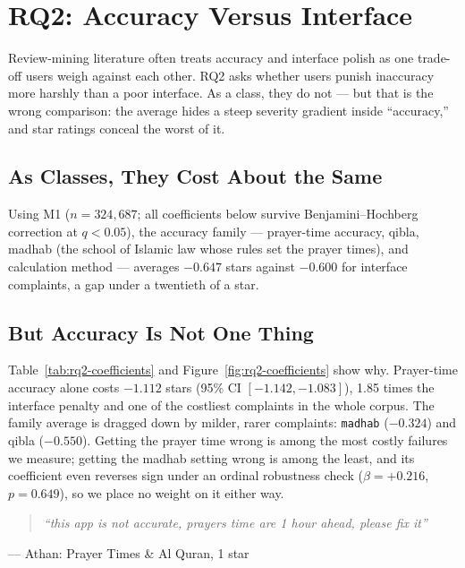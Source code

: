 
\section{RQ2: Accuracy Versus Interface}
\label{sec:rq2}

Review-mining literature often treats accuracy and interface polish as one
trade-off users weigh against each other. RQ2 asks whether users punish
inaccuracy more harshly than a poor interface. As a class, they do not ---
but that is the wrong comparison: the average hides a steep severity gradient
inside ``accuracy,'' and star ratings conceal the worst of it.

\subsection{As Classes, They Cost About the Same}

Using M1 (\(n=324{,}687\); all coefficients below survive Benjamini--Hochberg
correction at \(q<0.05\)), the accuracy family --- prayer-time accuracy,
qibla, madhab (the school of Islamic law whose rules set the prayer times),
and calculation method --- averages \(-0.647\) stars against \(-0.600\) for
interface complaints, a gap under a twentieth of a star.

\subsection{But Accuracy Is Not One Thing}

Table~\ref{tab:rq2-coefficients} and Figure~\ref{fig:rq2-coefficients} show why.
Prayer-time accuracy alone costs \(-1.112\) stars (95\% CI
\([-1.142, -1.083]\)), 1.85 times the interface penalty and one of the
costliest complaints in the whole corpus. The family average is dragged down
by milder, rarer complaints: \texttt{madhab} (\(-0.324\)) and qibla
(\(-0.550\)). Getting the prayer time wrong is among the most costly failures
we measure; getting the madhab setting wrong is among the least, and its
coefficient even reverses sign under an ordinal robustness check
(\(\beta=+0.216\), \(p=0.649\)), so we place no weight on it either way.

\begin{quote}
\itshape ``this app is not accurate, prayers time are 1 hour ahead, please fix
it''
\end{quote}
\hspace*{1em}--- Athan: Prayer Times \& Al Quran, 1 star

